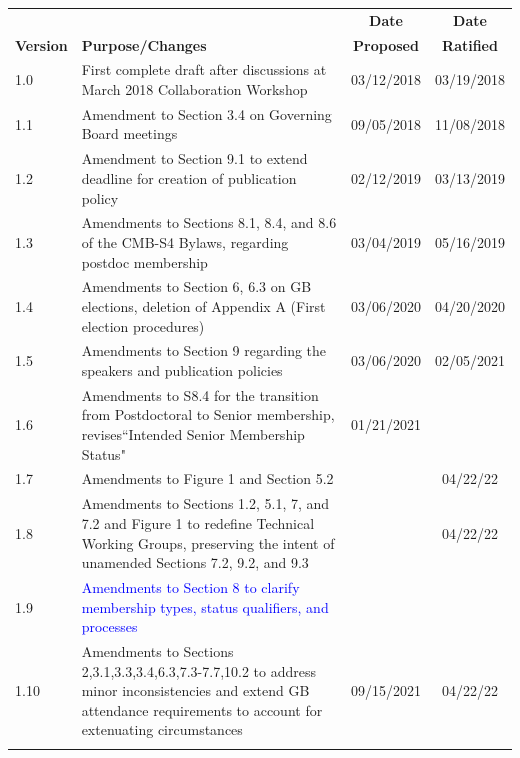 \documentclass[12pt]{article}
\begin{document}
\begin{table}[ht!]
\begin{center}
\begin{tabular}{| l | p{3.7in} | c | c |}
\hline
&  & {\bf Date} & {\bf Date}  \\
{\bf Version}  &  \hspace{1.0in} {\bf Purpose/Changes} & {\bf Proposed} & {\bf Ratified} \\
\hline\hline
1.0 & First complete draft after discussions at March 2018 Collaboration Workshop & 03/12/2018 & 03/19/2018 \\ \hline
1.1 & Amendment to Section 3.4 on Governing Board meetings & 09/05/2018 & 11/08/2018 \\ \hline
1.2 & Amendment to Section 9.1 to extend deadline for creation of publication policy & 02/12/2019 & 03/13/2019\\  \hline 
1.3 & Amendments to Sections 8.1, 8.4, and 8.6 of the CMB-S4 Bylaws, regarding postdoc membership & 03/04/2019 & 05/16/2019 \\ \hline
1.4 & Amendments to Section 6, 6.3 on GB elections, deletion of Appendix A (First election procedures) & 03/06/2020 & 04/20/2020 \\ \hline
1.5 & Amendments to Section 9 regarding the speakers and publication policies & 03/06/2020 & 02/05/2021 \\ \hline
1.6 & Amendments to S8.4 for the transition from Postdoctoral to Senior membership, revises``Intended Senior Membership Status" & 01/21/2021 & \\ \hline
1.7 & Amendments to Figure 1 and Section 5.2 & & 04/22/22 \\ \hline
1.8 & Amendments to Sections 1.2, 5.1, 7, and 7.2 and Figure 1 to redefine Technical Working Groups, preserving the intent of unamended Sections 7.2, 9.2, and 9.3 &  & 04/22/22\\ \hline
1.9 & \textcolor{blue}{Amendments to Section 8 to clarify membership types, status qualifiers, and processes} & & \\ \hline
1.10 & Amendments to Sections 2,3.1,3.3,3.4,6.3,7.3-7.7,10.2 to address minor inconsistencies and extend GB attendance requirements to account for extenuating circumstances & 09/15/2021 & 04/22/22 \\ \hline
& & &\\ \hline
\end{tabular}
\end{center}
\label{tab:version}
\end{table}
\end{document}
